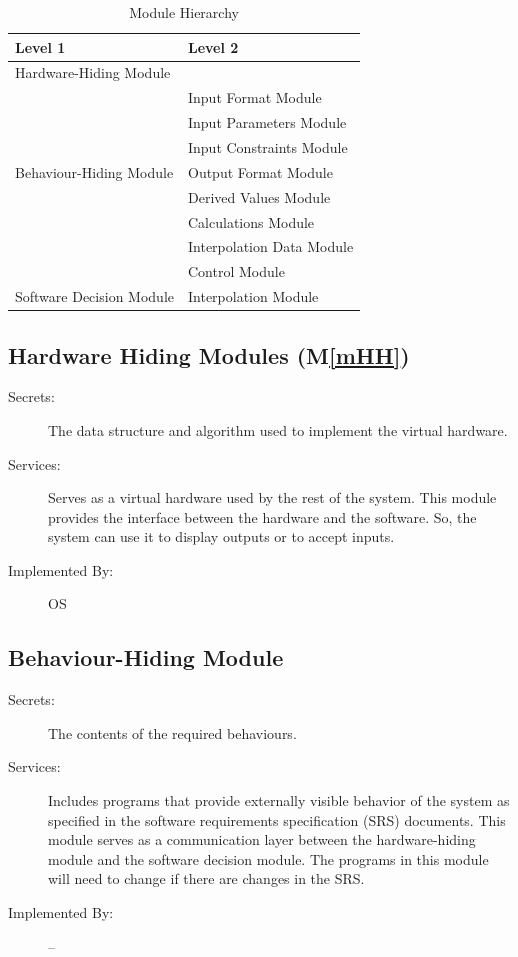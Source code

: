 \documentclass[12pt]{article}
\newcommand{\mref}[1]{M\ref{#1}}
\begin{document}
\begin{table}[h!]
\centering
\begin{tabular}{p{} p{}}
\toprule
\textbf{Level 1} & \textbf{Level 2}\\
\midrule

{Hardware-Hiding Module} & ~ \\
\midrule

\multirow{7}{0.3\textwidth}{Behaviour-Hiding Module} & Input Format Module\\
& Input Parameters Module\\
& Input Constraints Module\\
& Output Format Module\\
& Derived Values Module\\
& Calculations Module\\
& Interpolation Data Module\\
& Control Module\\

\midrule

\multirow{1}{0.3\textwidth}{Software Decision Module}
& Interpolation Module\\

\bottomrule

\end{tabular}
\caption{Module Hierarchy}
\label{TblMH}
\end{table}
\subsection{Hardware Hiding Modules (\mref{mHH})}

\begin{description}
\item[Secrets:]The data structure and algorithm used to implement the virtual
  hardware.
\item[Services:]Serves as a virtual hardware used by the rest of the
  system. This module provides the interface between the hardware and the
  software. So, the system can use it to display outputs or to accept inputs.
\item[Implemented By:] OS
\end{description}

\subsection{Behaviour-Hiding Module}

\begin{description}
\item[Secrets:]The contents of the required behaviours.
\item[Services:]Includes programs that provide externally visible behavior of
  the system as specified in the software requirements specification (SRS)
  documents. This module serves as a communication layer between the
  hardware-hiding module and the software decision module. The programs in this
  module will need to change if there are changes in the SRS.
\item[Implemented By:] --
\end{description}
\end{document}
